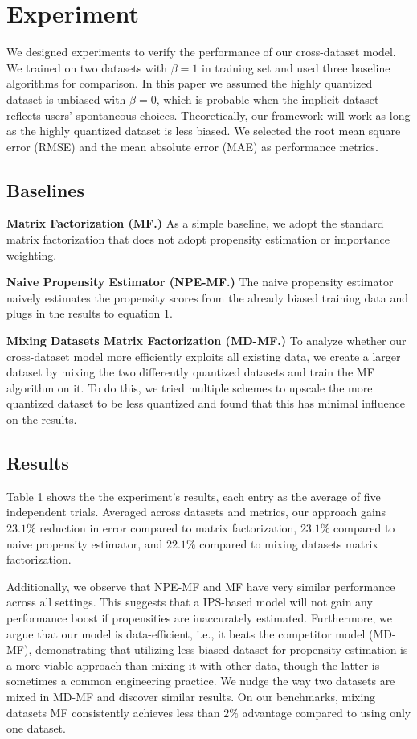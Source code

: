 \documentclass{article}
\begin{document}
\section{Experiment}
We designed experiments to verify the performance of our cross-dataset model. We trained on two datasets with $\beta =1$ in training set and used three baseline algorithms for comparison. In this paper we assumed the highly quantized dataset is unbiased with $\beta=0$, which is probable when the implicit dataset reflects users' spontaneous choices. Theoretically, our framework will work as long as the highly quantized dataset is less biased. We selected the root mean square error (RMSE) and the mean absolute error (MAE) as performance metrics. 

\subsection{Baselines}
\textbf{Matrix Factorization (MF.)}
As a simple baseline, we adopt the standard matrix factorization that does not adopt propensity estimation or importance weighting.

\textbf{Naive Propensity Estimator (NPE-MF.)}
The naive propensity estimator naively estimates the propensity scores from the already biased training data and plugs in the results to equation 1.

\textbf{Mixing Datasets Matrix Factorization (MD-MF.)}
To analyze whether our cross-dataset model more efficiently exploits all existing data, we create a larger dataset by mixing the two differently quantized datasets and train the MF algorithm on it. To do this, we tried multiple schemes to upscale the more quantized dataset to be less quantized and found that this has minimal influence on the results.

\subsection{Results}
Table 1 shows the the experiment's results, each entry as the average of five independent trials. Averaged across datasets and metrics, our approach gains $23.1\%$ reduction in error compared to matrix factorization, $23.1\%$ compared to naive propensity estimator, and $22.1\%$ compared to mixing datasets matrix factorization. 

Additionally, we observe that NPE-MF and MF have very similar performance across all settings. This suggests that a IPS-based model will not gain any performance boost if propensities are inaccurately estimated. Furthermore, we argue that our model is data-efficient, i.e., it beats the competitor model (MD-MF), demonstrating that utilizing less biased dataset for propensity estimation is a more viable approach than mixing it with other data, though the latter is sometimes a common engineering practice. We nudge the way two datasets are mixed in MD-MF and discover similar results. On our benchmarks, mixing datasets MF consistently achieves less than $2\%$ advantage compared to using only one dataset.
\end{document}
